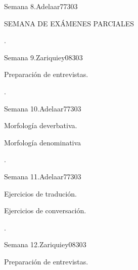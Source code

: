 \begin{syllabus}
\begin{unit}{}{Semana 8.}{Adelaar77}{30}{3}
   \begin{topics}
      \item SEMANA DE EXÁMENES PARCIALES
   \end{topics}

   \begin{learningoutcomes}
      \item .
   \end{learningoutcomes}
\end{unit}

\begin{unit}{}{Semana 9.}{Zariquiey08}{30}{3}
   \begin{topics}
      \item Preparación de entrevistas.
   \end{topics}

   \begin{learningoutcomes}
      \item .
   \end{learningoutcomes}
\end{unit}

\begin{unit}{}{Semana 10.}{Adelaar77}{30}{3}
   \begin{topics}
      \item Morfología deverbativa.
      \item Morfología denominativa
   \end{topics}

   \begin{learningoutcomes}
      \item .
   \end{learningoutcomes}
\end{unit}

\begin{unit}{}{Semana 11.}{Adelaar77}{30}{3}
   \begin{topics}
      \item Ejercicios de tradución.
      \item Ejercicios de conversación.
   \end{topics}

   \begin{learningoutcomes}
      \item . 
   \end{learningoutcomes}
\end{unit}

\begin{unit}{}{Semana 12.}{Zariquiey08}{30}{3}
   \begin{topics}
      \item Preparación de entrevistas.
   \end{topics}


\end{unit}
\end{syllabus}

